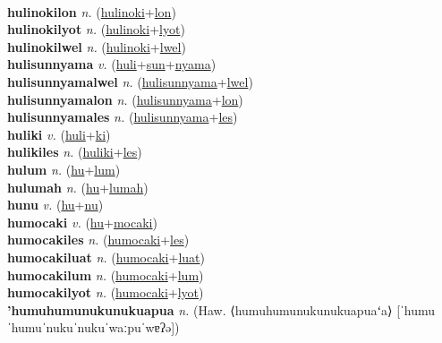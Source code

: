 \label{hulinokiles} \\
\textbf{hulinokilon} \textit{n.} (\hyperref[hulinoki]{hulinoki}+\hyperref[lon]{lon})
 \label{hulinokilon} \\
\textbf{hulinokilyot} \textit{n.} (\hyperref[hulinoki]{hulinoki}+\hyperref[lyot]{lyot})
 \label{hulinokilyot} \\
\textbf{hulinokilwel} \textit{n.} (\hyperref[hulinoki]{hulinoki}+\hyperref[lwel]{lwel})
 \label{hulinokilwel} \\
\textbf{hulisunnyama} \textit{v.} (\hyperref[huli]{huli}+\hyperref[sun]{sun}+\hyperref[nyama]{nyama})
 \label{hulisunnyama} \\
\textbf{hulisunnyamalwel} \textit{n.} (\hyperref[hulisunnyama]{hulisunnyama}+\hyperref[lwel]{lwel})
 \label{hulisunnyamalwel} \\
\textbf{hulisunnyamalon} \textit{n.} (\hyperref[hulisunnyama]{hulisunnyama}+\hyperref[lon]{lon})
 \label{hulisunnyamalon} \\
\textbf{hulisunnyamales} \textit{n.} (\hyperref[hulisunnyama]{hulisunnyama}+\hyperref[les]{les})
 \label{hulisunnyamales} \\
\textbf{huliki} \textit{v.} (\hyperref[huli]{huli}+\hyperref[ki]{ki})
 \label{huliki} \\
\textbf{hulikiles} \textit{n.} (\hyperref[huliki]{huliki}+\hyperref[les]{les})
 \label{hulikiles} \\
\textbf{hulum} \textit{n.} (\hyperref[hu]{hu}+\hyperref[lum]{lum})
 \label{hulum} \\
\textbf{hulumah} \textit{n.} (\hyperref[hu]{hu}+\hyperref[lumah]{lumah})
 \label{hulumah} \\
\textbf{hunu} \textit{v.} (\hyperref[hu]{hu}+\hyperref[nu]{nu})
 \label{hunu} \\
\textbf{humocaki} \textit{v.} (\hyperref[hu]{hu}+\hyperref[mocaki]{mocaki})
 \label{humocaki} \\
\textbf{humocakiles} \textit{n.} (\hyperref[humocaki]{humocaki}+\hyperref[les]{les})
 \label{humocakiles} \\
\textbf{humocakiluat} \textit{n.} (\hyperref[humocaki]{humocaki}+\hyperref[luat]{luat})
 \label{humocakiluat} \\
\textbf{humocakilum} \textit{n.} (\hyperref[humocaki]{humocaki}+\hyperref[lum]{lum})
 \label{humocakilum} \\
\textbf{humocakilyot} \textit{n.} (\hyperref[humocaki]{humocaki}+\hyperref[lyot]{lyot})
 \label{humocakilyot} \\
\textbf{'humuhumunukunukuapua} \textit{n.} (Haw. ⟨humuhumunukunukuapuaʻa⟩ [ˈhumuˈhumuˈnukuˈnukuˈwaːpuˈwɐʔə])
